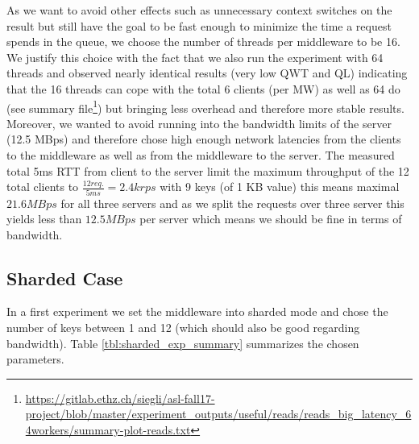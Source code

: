 \documentclass[11pt,a4paper]{article}
\begin{document}
As we want to avoid other effects such as unnecessary context switches on the result but still have the goal to be fast enough to minimize the time a request spends in the queue, we choose the number of threads per middleware to be 16. We justify this choice with the fact that we also run the experiment with 64 threads and observed nearly identical results (very low QWT and QL) indicating that the 16 threads can cope with the total 6 clients (per MW) as well as 64 do (see summary file\footnote{\url{https://gitlab.ethz.ch/siegli/asl-fall17-project/blob/master/experiment_outputs/useful/reads/reads_big_latency_64workers/summary-plot-reads.txt}}) but bringing less overhead and therefore more stable results. Moreover, we wanted to avoid running into the bandwidth limits of the server (12.5 MBps) and therefore chose high enough network latencies from the clients to the middleware as well as from the middleware to the server. The measured total 5ms RTT from client to the server limit the maximum throughput of the 12 total clients to $\frac{12 req.}{5 ms} = 2.4k rps$ with 9 keys (of 1 KB value) this means maximal $21.6 MBps$ for all three servers and as we split the requests over three server this yields less than $12.5 MBps$ per server which means we should be fine in terms of bandwidth.


\subsection{Sharded Case}\label{sub:sharded}

In a first experiment we set the middleware into sharded mode and chose the number of keys between 1 and 12 (which should also be good regarding bandwidth). Table \ref{tbl:sharded_exp_summary} summarizes the chosen parameters.
\end{document}
